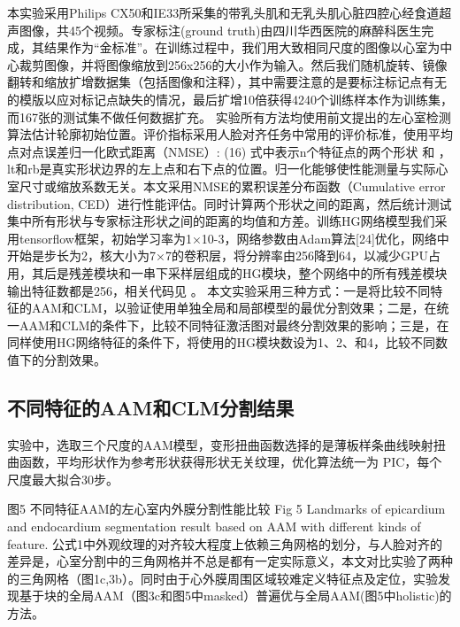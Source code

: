 本实验采用Philips CX50和IE33所采集的带乳头肌和无乳头肌心脏四腔心经食道超声图像，共45个视频。专家标注(ground truth)由四川华西医院的麻醉科医生完成，其结果作为“金标准”。在训练过程中，我们用大致相同尺度的图像以心室为中心裁剪图像，并将图像缩放到256x256的大小作为输入。然后我们随机旋转、镜像翻转和缩放扩增数据集（包括图像和注释），其中需要注意的是要标注标记点有无的模版以应对标记点缺失的情况，最后扩增10倍获得4240个训练样本作为训练集，而167张的测试集不做任何数据扩充。
实验所有方法均使用前文提出的左心室检测算法估计轮廓初始位置。评价指标采用人脸对齐任务中常用的评价标准，使用平均点对点误差归一化欧式距离（NMSE）:
	  	(16)
式中表示n个特征点的两个形状 和 ，lt和rb是真实形状边界的左上点和右下点的位置。归一化能够使性能测量与实际心室尺寸或缩放系数无关。本文采用NMSE的累积误差分布函数（Cumulative error distribution, CED）进行性能评估。同时计算两个形状之间的距离，然后统计测试集中所有形状与专家标注形状之间的距离的均值和方差。训练HG网络模型我们采用tensorflow框架，初始学习率为1×10-3，网络参数由Adam算法[24]优化，网络中开始是步长为2，核大小为7×7的卷积层，将分辨率由256降到64，以减少GPU占用，其后是残差模块和一串下采样层组成的HG模块，整个网络中的所有残差模块输出特征数都是256，相关代码见 。
本文实验采用三种方式：一是将比较不同特征的AAM和CLM，以验证使用单独全局和局部模型的最优分割效果；二是，在统一AAM和CLM的条件下，比较不同特征激活图对最终分割效果的影响；三是，在同样使用HG网络特征的条件下，将使用的HG模块数设为1、2、和4，比较不同数值下的分割效果。

\subsection{不同特征的AAM和CLM分割结果}
实验中，选取三个尺度的AAM模型，变形扭曲函数选择的是薄板样条曲线映射扭曲函数，平均形状作为参考形状获得形状无关纹理，优化算法统一为 PIC，每个尺度最大拟合30步。
 
图5 不同特征AAM的左心室内外膜分割性能比较
Fig 5 Landmarks of epicardium and endocardium segmentation result based on AAM with different kinds of feature.
公式1中外观纹理的对齐较大程度上依赖三角网格的划分，与人脸对齐的差异是，心室分割中的三角网格并不总是都有一定实际意义，本文对比实验了两种的三角网格（图1c,3b）。同时由于心外膜周围区域较难定义特征点及定位，实验发现基于块的全局AAM（图3c和图5中masked）普遍优与全局AAM(图5中holistic)的方法。
 
